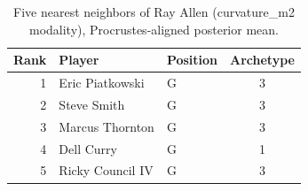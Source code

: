 \begin{table}[htbp]
  \centering\small
  \begin{tabular}{rllc}
    \toprule
    Rank & Player & Position & Archetype \\
    \midrule
    1 & Eric Piatkowski & G & 3 \\
    2 & Steve Smith & G & 3 \\
    3 & Marcus Thornton & G & 3 \\
    4 & Dell Curry & G & 1 \\
    5 & Ricky Council IV & G & 3 \\
    \bottomrule
  \end{tabular}
  \caption{Five nearest neighbors of Ray Allen (curvature_m2 modality), Procrustes-aligned posterior mean.}
  \label{tab:Ray_Allen_neighbors_curvature_m2}
\end{table}


